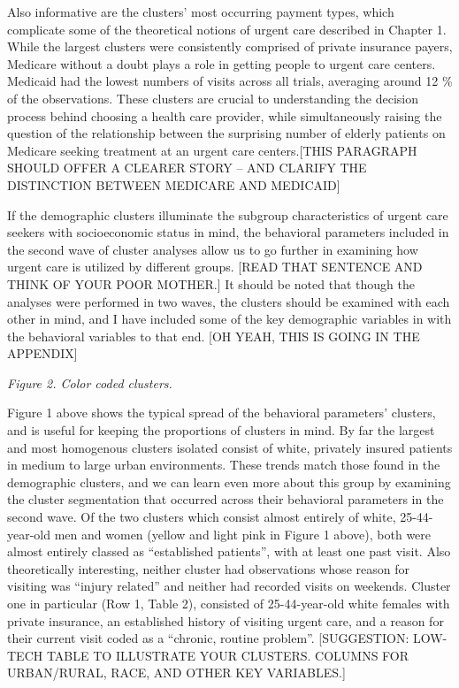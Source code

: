 \documentclass[12pt,twoside]{reedthesis}
\begin{document}
  Also informative are the clusters' most occurring payment types, which
  complicate some of the theoretical notions of urgent care described in
  Chapter 1. While the largest clusters were consistently comprised of
  private insurance payers, Medicare without a doubt plays a role in
  getting people to urgent care centers. Medicaid had the lowest numbers
  of visits across all trials, averaging around 12 \% of the observations.
  These clusters are crucial to understanding the decision process behind
  choosing a health care provider, while simultaneously raising the
  question of the relationship between the surprising number of elderly
  patients on Medicare seeking treatment at an urgent care centers.{[}THIS
  PARAGRAPH SHOULD OFFER A CLEARER STORY -- AND CLARIFY THE DISTINCTION
  BETWEEN MEDICARE AND MEDICAID{]}
  
  If the demographic clusters illuminate the subgroup characteristics of
  urgent care seekers with socioeconomic status in mind, the behavioral
  parameters included in the second wave of cluster analyses allow us to
  go further in examining how urgent care is utilized by different groups.
  {[}READ THAT SENTENCE AND THINK OF YOUR POOR MOTHER.{]} It should be
  noted that though the analyses were performed in two waves, the clusters
  should be examined with each other in mind, and I have included some of
  the key demographic variables in with the behavioral variables to that
  end. {[}OH YEAH, THIS IS GOING IN THE APPENDIX{]}
  
  \emph{Figure 2. Color coded clusters.}
  
  Figure 1 above shows the typical spread of the behavioral parameters'
  clusters, and is useful for keeping the proportions of clusters in mind.
  By far the largest and most homogenous clusters isolated consist of
  white, privately insured patients in medium to large urban environments.
  These trends match those found in the demographic clusters, and we can
  learn even more about this group by examining the cluster segmentation
  that occurred across their behavioral parameters in the second wave. Of
  the two clusters which consist almost entirely of white, 25-44-year-old
  men and women (yellow and light pink in Figure 1 above), both were
  almost entirely classed as ``established patients'', with at least one
  past visit. Also theoretically interesting, neither cluster had
  observations whose reason for visiting was ``injury related'' and
  neither had recorded visits on weekends. Cluster one in particular (Row
  1, Table 2), consisted of 25-44-year-old white females with private
  insurance, an established history of visiting urgent care, and a reason
  for their current visit coded as a ``chronic, routine problem''.
  {[}SUGGESTION: LOW-TECH TABLE TO ILLUSTRATE YOUR CLUSTERS. COLUMNS FOR
  URBAN/RURAL, RACE, AND OTHER KEY VARIABLES.{]}
  
\end{document}
